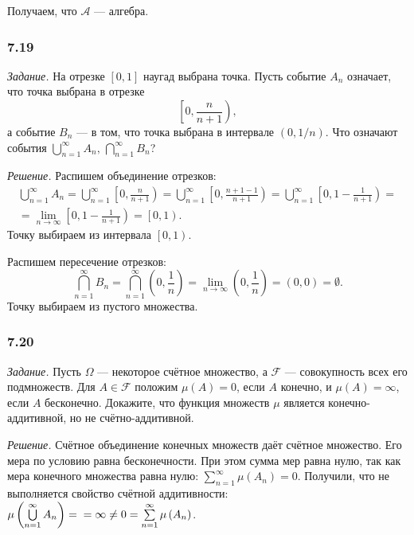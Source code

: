 Получаем, что $ \mathcal{A} $ --- алгебра.

\subsubsection*{7.19}

\textit{Задание.} На отрезке $ \left[ 0, 1 \right] $ наугад выбрана точка.
Пусть событие $A_n$ означает, что точка выбрана в отрезке
$$ \left[ 0, \frac{n}{n+1} \right),$$
а событие $B_n$ --- в том, что точка выбрана в интервале $ \left( 0, 1/n \right) $.
Что означают события $ \bigcup \limits_{n=1}^{ \infty } A_n, \, \bigcap \limits_{n=1}^{ \infty } B_n$?

\textit{Решение.} Распишем объединение отрезков:
\begin{equation*}
\begin{split}
\bigcup \limits_{n=1}^{ \infty } A_n =
\bigcup \limits_{n=1}^{ \infty } \left[ 0, \frac{n}{n+1} \right) =
\bigcup \limits_{n=1}^{ \infty } \left[ 0, \frac{n+1-1}{n+1} \right) =
\bigcup \limits_{n=1}^{ \infty } \left[ 0, 1 - \frac{1}{n+1} \right) = \\
= \lim \limits_{n \rightarrow \infty } \left[ 0, 1 - \frac{1}{n+1} \right) =
\left[ 0, 1 \right).
\end{split}
\end{equation*}
Точку выбираем из интервала $ \left[ 0, 1 \right) $.

Распишем пересечение отрезков:
$$ \bigcap \limits_{n=1}^{ \infty } B_n =
\bigcap \limits_{n=1}^{ \infty } \left( 0, \frac{1}{n} \right) =
\lim \limits_{n \rightarrow \infty } \left( 0, \frac{1}{n} \right) =
\left( 0, 0 \right) =
\emptyset.$$
Точку выбираем из пустого множества.

\subsubsection*{7.20}

\textit{Задание.} Пусть $ \Omega $ --- некоторое счётное множество, а $ \mathcal{F} $ --- совокупность всех его подмножеств.
Для $A \in \mathcal{F} $ положим $ \mu \left( A \right) = 0$, если $A$ конечно, и $ \mu \left( A \right) = \infty $, если $A$ бесконечно.
Докажите, что функция множеств $ \mu $ является конечно-аддитивной, но не счётно-аддитивной.

\textit{Решение.} Счётное объединение конечных множеств даёт счётное множество.
Его мера по условию равна бесконечности.
При этом сумма мер равна нулю, так как мера конечного множества равна нулю: $ \sum \limits_{n=1}^{ \infty } \mu \left( A_n \right) = 0$.
Получили, что не выполняется свойство счётной аддитивности:
$ \mu \left( \bigcup \limits_{n=1}^{ \infty } A_n \right) = \\
= \infty \neq
0 =
\sum \limits_{n=1}^{ \infty } \mu \left( A_n \right) $.


